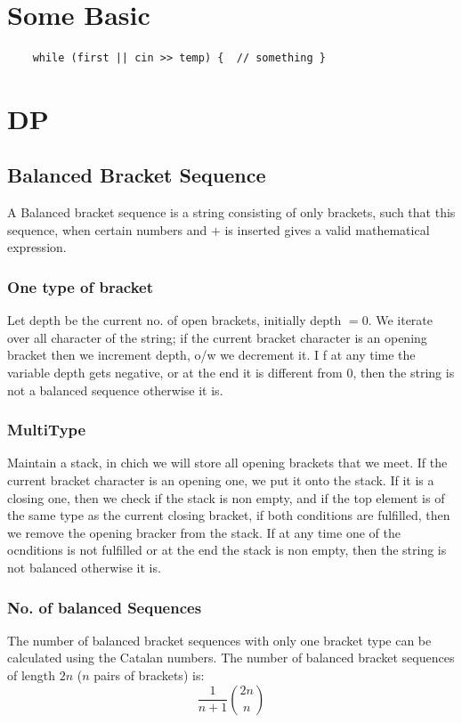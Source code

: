 \documentclass[8pt, a4paper, oneside, twocolumn]{extarticle}
\begin{document}
\section{Some Basic}
\begin{verbatim}
	while (first || cin >> temp) {  // something }
\end{verbatim}
\section{DP}
\subsection{Balanced Bracket Sequence}
A Balanced bracket sequence is a string consisting of only brackets, such that this sequence, when certain numbers and $+$ is inserted gives a valid mathematical expression.
\subsubsection{One type of bracket}
Let depth be the current no. of open brackets, initially depth $= 0$. We iterate over all character of the string; if the current bracket character is an opening bracket then we increment depth, o/w we decrement it. I f at any time the variable depth gets negative, or at the end it is different from 0, then the string is not a balanced sequence otherwise it is.
\subsubsection{MultiType}
Maintain a stack, in chich we will store all opening brackets that we meet. If the current bracket character is an opening one, we put it onto the stack. If it is a closing one, then we check if the stack is non empty, and if the top element is of the same type as the current closing bracket, if both conditions are fulfilled, then we remove the opening bracker from the stack. If at any time one of the ocnditions is not fulfilled or at the end the stack is non empty, then the string is not balanced otherwise it is.
\subsubsection{No. of balanced Sequences}
The number of balanced bracket sequences with only one bracket type can be calculated using the Catalan numbers. The number of balanced bracket sequences of length $2n$ ($n$ pairs of brackets) is: $$\frac{1}{n+1} \binom{2n}{n}$$
\end{document}
